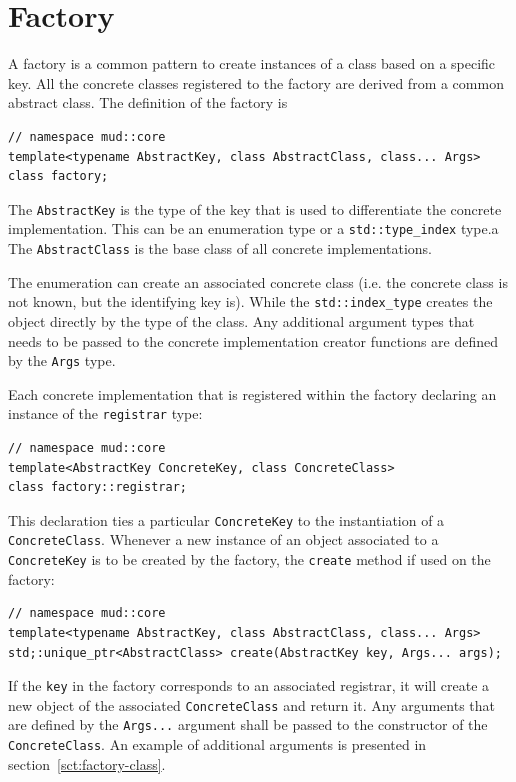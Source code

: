 \documentclass[10pt,a4paper,openany]{mudbook}
\makeatletter
\newcommand{\indextt}[2][]{\texttt{#2}\index{#2@\texttt{#2}#1}}
\makeatother
\begin{document}
\chapter{Factory}
\label{chp:core-factory}

A factory is a common pattern to create instances of a class based on a
specific key. All the concrete classes registered to the factory are derived
from a common abstract class. The definition of the factory is

\begin{lstlisting}[style=definition]
// namespace mud::core
template<typename AbstractKey, class AbstractClass, class... Args>
class factory;
\end{lstlisting}

The \texttt{AbstractKey} is the type of the key that is used to differentiate
the concrete implementation. This can be an enumeration type or a 
 \texttt{std::type\_index} type.a The \texttt{AbstractClass} is the base class
of all concrete implementations. 

The enumeration can create an associated concrete class (i.e. the concrete class
is not known, but the identifying key is). While the \texttt{std::index\_type}
creates the object directly by the type of the class. Any additional argument
types that needs to be passed to the concrete implementation creator functions
are defined by the \texttt{Args} type.

Each concrete implementation that is registered within the factory declaring
an instance of the \indextt{registrar} type:

\begin{lstlisting}[style=definition]
// namespace mud::core 
template<AbstractKey ConcreteKey, class ConcreteClass>
class factory::registrar;
\end{lstlisting}

This declaration ties a particular \texttt{ConcreteKey} to the instantiation of
a \texttt{ConcreteClass}. Whenever a new instance of an object associated to a
\texttt{ConcreteKey} is to be created by the factory, the \texttt{create} method
if used on the factory:

\begin{lstlisting}[style=definition]
// namespace mud::core 
template<typename AbstractKey, class AbstractClass, class... Args>
std;:unique_ptr<AbstractClass> create(AbstractKey key, Args... args);
\end{lstlisting}

If the \texttt{key} in the factory corresponds to an associated registrar, it
will create a new object of the associated \texttt{ConcreteClass} and return it.
Any arguments that are defined by the \texttt{Args...} argument shall be passed
to the constructor of the \texttt{ConcreteClass}. An example of additional
arguments is presented in section~\ref{sct:factory-class}.
\end{document}
